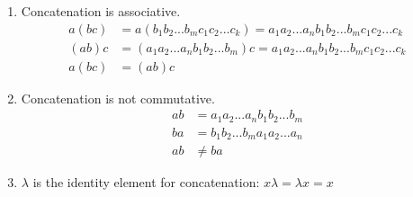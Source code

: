 \begin{enumerate}[label={\Alph*.},font={\bfseries}]
\begin{enumerate}[label={\arabic*},font={\bfseries}]
      \item Concatenation is associative.
        \begin{align*}
          a(bc) &= a(b_1b_2...b_mc_1c_2...c_k) = a_1a_2...a_nb_1b_2...b_mc_1c_2...c_k \\
          (ab)c &= (a_1a_2...a_nb_1b_2...b_m)c = a_1a_2...a_nb_1b_2...b_mc_1c_2...c_k \\
          a(bc) &= (ab)c
        \end{align*}
      \item Concatenation is not commutative.
        \begin{align*}
          ab &= a_1a_2...a_nb_1b_2...b_m \\
          ba &= b_1b_2...b_ma_1a_2...a_n \\
          ab &\neq ba
        \end{align*}
      \item $\lambda$ is the identity element for concatenation:
        $x\lambda = \lambda{}x = x$
    \end{enumerate}
\end{enumerate}
